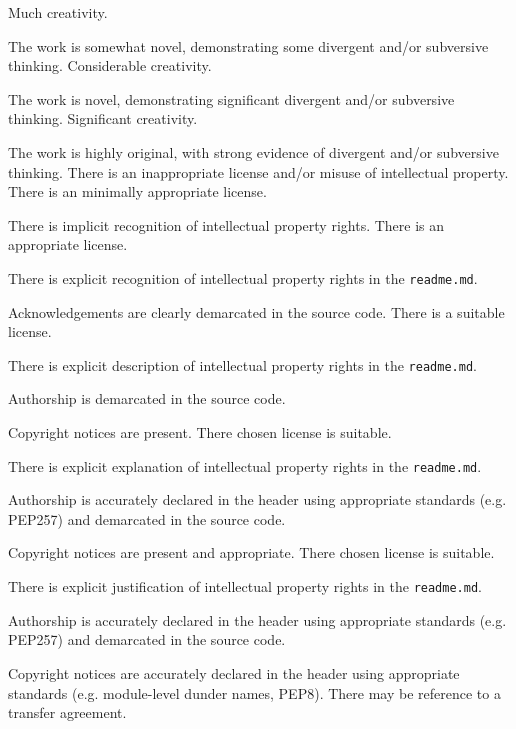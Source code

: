 \documentclass{../../fal_assignment}
\begin{document}
\begin{markingrubric}
        \grade Much creativity.
            \par The work is somewhat novel, demonstrating some divergent and/or subversive thinking.
        \grade Considerable creativity.
            \par The work is novel, demonstrating significant divergent and/or subversive thinking.
        \grade Significant creativity.
            \par The work is highly original, with strong evidence of divergent and/or subversive thinking.
%
        \grade\fail There is an inappropriate license and/or misuse of intellectual property.
        \grade There is an minimally appropriate license.
            \par There is implicit recognition of intellectual property rights.
        \grade There is an appropriate license. 
            \par There is explicit recognition of intellectual property rights in the \texttt{readme.md}.
            \par Acknowledgements are clearly demarcated in the source code.
        \grade There is a suitable license.
            \par There is explicit description of intellectual property rights in the \texttt{readme.md}.
            \par Authorship is demarcated in the source code.
            \par Copyright notices are present.
        \grade There chosen license is suitable. 
            \par There is explicit explanation of intellectual property rights in the \texttt{readme.md}.
            \par Authorship is accurately declared in the header using appropriate standards (e.g. PEP257) and demarcated in the source code.
            \par Copyright notices are present and appropriate.
        \grade There chosen license is suitable.
            \par There is explicit justification of intellectual property rights in the \texttt{readme.md}.
            \par Authorship is accurately declared in the header using appropriate standards (e.g. PEP257) and demarcated in the source code.
            \par Copyright notices are accurately declared in the header using appropriate standards (e.g. module-level dunder names, PEP8). There may be reference to a transfer agreement.

\end{markingrubric}
\end{document}
